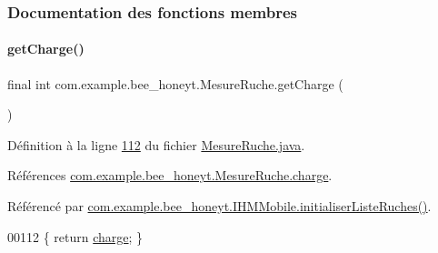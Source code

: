\subsubsection{Documentation des fonctions membres}
\mbox{\label{classcom_1_1example_1_1bee__honeyt_1_1_mesure_ruche_a5fb489924272149140eb7a4c81cacaec}} 
\paragraph{\texorpdfstring{get\+Charge()}{getCharge()}}
{\footnotesize\ttfamily final int com.\+example.\+bee\+\_\+honeyt.\+Mesure\+Ruche.\+get\+Charge (\begin{DoxyParamCaption}{ }\end{DoxyParamCaption})}



Définition à la ligne \hyperlink{_mesure_ruche_8java_source_l00112}{112} du fichier \hyperlink{_mesure_ruche_8java_source}{Mesure\+Ruche.\+java}.



Références \hyperlink{_mesure_ruche_8java_source_l00023}{com.\+example.\+bee\+\_\+honeyt.\+Mesure\+Ruche.\+charge}.



Référencé par \hyperlink{_i_h_m_mobile_8java_source_l00170}{com.\+example.\+bee\+\_\+honeyt.\+I\+H\+M\+Mobile.\+initialiser\+Liste\+Ruches()}.


\begin{DoxyCode}
00112 \{ \textcolor{keywordflow}{return} \hyperlink{classcom_1_1example_1_1bee__honeyt_1_1_mesure_ruche_a5ac02bc1d6195faa400e5a3171eed3f4}{charge}; \}
\end{DoxyCode}
\mbox{\label{classcom_1_1example_1_1bee__honeyt_1_1_mesure_ruche_ab16738883de0f1535d25bc36b828cc7a}} 
